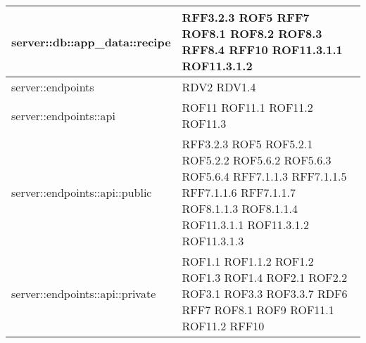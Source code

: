 \begin{center}
\begin{longtable}{| p{9cm} | p{4cm} |}
\hline
server::db::app\_data::recipe &  RFF3.2.3 \newline ROF5 \newline RFF7 \newline ROF8.1 \newline ROF8.2 \newline ROF8.3 \newline RFF8.4 \newline RFF10 \newline ROF11.3.1.1 \newline ROF11.3.1.2 \newline \\
\hline
server::endpoints  &  RDV2 \newline RDV1.4 \newline \\
\hline
server::endpoints::api  &  ROF11 \newline ROF11.1 \newline ROF11.2 \newline ROF11.3 \newline \\
\hline
server::endpoints::api::public  &  RFF3.2.3 \newline ROF5 \newline ROF5.2.1 \newline ROF5.2.2 \newline ROF5.6.2 \newline ROF5.6.3 \newline ROF5.6.4 \newline RFF7.1.1.3 \newline RFF7.1.1.5 \newline RFF7.1.1.6 \newline RFF7.1.1.7 \newline ROF8.1.1.3 \newline  ROF8.1.1.4 \newline ROF11.3.1.1 \newline ROF11.3.1.2 \newline ROF11.3.1.3  \newline \\
\hline
server::endpoints::api::private  &  ROF1.1 \newline ROF1.1.2 \newline ROF1.2 \newline ROF1.3 \newline ROF1.4 \newline ROF2.1 \newline ROF2.2 \newline ROF3.1 \newline ROF3.3 \newline ROF3.3.7 \newline RDF6 \newline RFF7 \newline ROF8.1 \newline ROF9 \newline ROF11.1 \newline ROF11.2  \newline RFF10 \newline \\

\end{longtable}
\end{center}
